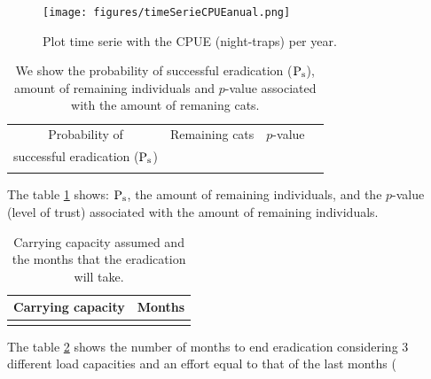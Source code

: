 \documentclass{article}
\begin{document}
{{\begin{figure}[H]
    \centering
\texttt{[image: figures/timeSerieCPUEanual.png]}
\caption{Plot time serie with the CPUE (night-traps) per year.}
\label{fig:SerieDeTiempoCPUEPorAnio}
\end{figure}


\begin{table}[H]
\centering
\caption{\small{We show the probability of successful eradication ($\textnormal{P}_\textnormal{s}$), amount of remaining individuals and $p$-value associated with the amount of remaning cats.}}
\label{table:individuosRemanentes}
\begin{tabular}{ |c|c|c|c| }
    \hline
    Probability of & Remaining cats & $p$-value \\
    successful eradication ($\textnormal{P}_\textnormal{s}$) & & \\
    \hline
    \py{'%
    \hline
\end{tabular}
\end{table}


The table \ref{table:individuosRemanentes} shows: $\textnormal{P}_\textnormal{s}$, 
the amount of remaining individuals, and the $p$-value (level of trust) associated with the amount of remaining individuals.

\begin{table}[H]
\centering
\caption{\small{Carrying capacity assumed and the months that the eradication will take.}}
\label{table:carryingCapacity}
\begin{tabular}{ |c|c| }
    \hline
    Carrying capacity & Months \\
    \hline
    \py{'%
    \py{'%
    \py{'%
    \hline
\end{tabular}
\end{table}

The table \ref{table:carryingCapacity} shows the number of months to end eradication considering 3 different load capacities and an effort equal to that of the last months (\py{'%

}}}
\end{document}
